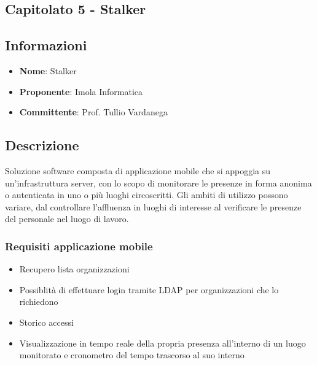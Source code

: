 \subsection{Capitolato 5 - Stalker}

\subsection{Informazioni}
\begin{itemize}
	\item \textbf{Nome}: Stalker
	\item \textbf{Proponente}: Imola Informatica
	\item \textbf{Committente}: Prof. Tullio Vardanega
\end{itemize}

\subsection{Descrizione}
Soluzione software composta di applicazione mobile che si appoggia su un'infrastruttura server, con lo scopo di monitorare le presenze in forma anonima o autenticata in uno o più luoghi circoscritti.
Gli ambiti di utilizzo possono variare, dal controllare l'affluenza in luoghi di interesse al verificare le presenze del personale nel luogo di lavoro.

\subsubsection{Requisiti applicazione mobile}
\begin{itemize}
	\item Recupero lista organizzazioni
	\item Possiblità di effettuare login tramite LDAP per organizzazioni che lo richiedono
	\item Storico accessi
	\item Visualizzazione in tempo reale della propria presenza all'interno di un luogo monitorato e cronometro del tempo trascorso al suo interno
\end{itemize}

